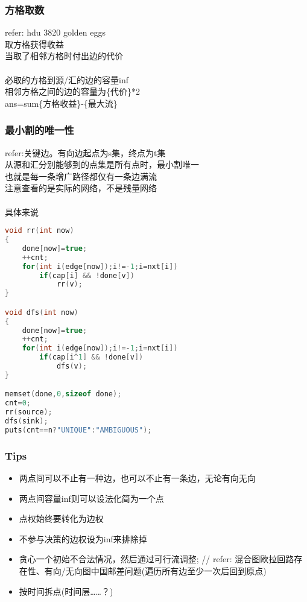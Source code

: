 \subsubsection{方格取数}
refer: hdu 3820 golden eggs\\
取方格获得收益\\
当取了相邻方格时付出边的代价\\
\\
必取的方格到源/汇的边的容量inf\\
相邻方格之间的边的容量为\{代价\}*2\\
ans=sum\{方格收益\}-\{最大流\}
\subsubsection{最小割的唯一性}
refer:关键边。有向边起点为s集，终点为t集\\
从源和汇分别能够到的点集是所有点时，最小割唯一\\
也就是每一条增广路径都仅有一条边满流\\
注意查看的是实际的网络，不是残量网络\\
\\
具体来说
\begin{lstlisting}[language=C++]
void rr(int now)
{
    done[now]=true;
    ++cnt;
    for(int i(edge[now]);i!=-1;i=nxt[i])
        if(cap[i] && !done[v])
            rr(v);
}

void dfs(int now)
{
    done[now]=true;
    ++cnt;
    for(int i(edge[now]);i!=-1;i=nxt[i])
        if(cap[i^1] && !done[v])
            dfs(v);
}

memset(done,0,sizeof done);
cnt=0;
rr(source);
dfs(sink);
puts(cnt==n?"UNIQUE":"AMBIGUOUS");
\end{lstlisting}
\subsubsection{Tips}
\begin{itemize}
\item 两点间可以不止有一种边，也可以不止有一条边，无论有向无向
\item 两点间容量inf则可以设法化简为一个点
\item 点权始终要转化为边权
\item 不参与决策的边权设为inf来排除掉
\item 贪心一个初始不合法情况，然后通过可行流调整; // refer: 混合图欧拉回路存在性、有向/无向图中国邮差问题(遍历所有边至少一次后回到原点)
\item 按时间拆点(时间层……？)
\end{itemize}
